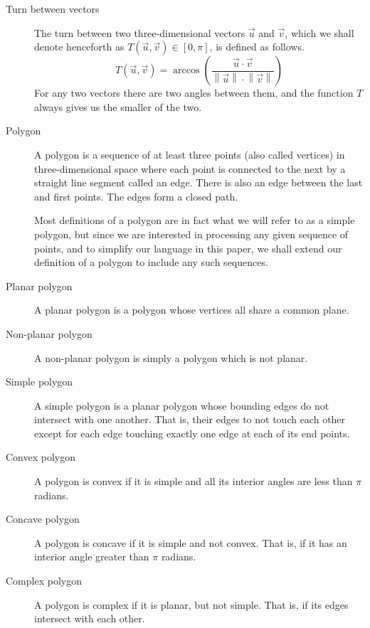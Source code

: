 \documentclass{article}
\newcommand{\len}[1]{\left\lVert #1 \right\rVert}
\begin{document}
\begin{description}
	\item[Turn between vectors]
		The turn between two three-dimensional vectors \(\vec{u}\) and \(\vec{v}\), which we shall denote henceforth as \(T(\vec{u}, \vec{v}) \in [0, \pi]\), is defined as follows.
		\begin{equation*}
			T(\vec{u}, \vec{v}) = \arccos \left( \frac{\vec{u} \cdot \vec{v}} {\len{\vec{u}} \cdot \len{\vec{v}}} \right)
		\end{equation*}
		For any two vectors there are two angles between them, and the function \(T\) always gives us the smaller of the two.

	\item[Polygon]
		A polygon is a sequence of at least three points (also called vertices) in three-dimensional space where each point is connected to the next by a straight line segment called an edge. There is also an edge between the last and first points. The edges form a closed path.

		Most definitions of a polygon are in fact what we will refer to as a simple polygon, but since we are interested in processing any given sequence of points, and to simplify our language in this paper, we shall extend our definition of a polygon to include any such sequences.

	\item[Planar polygon]
		A planar polygon is a polygon whose vertices all share a common plane.

	\item[Non-planar polygon]
		A non-planar polygon is simply a polygon which is not planar.

	\item[Simple polygon]
		A simple polygon is a planar polygon whose bounding edges do not intersect with one another. That is, their edges to not touch each other except for each edge touching exactly one edge at each of its end points.

	\item[Convex polygon]
		A polygon is convex if it is simple and all its interior angles are less than \(\pi\) radians.

	\item[Concave polygon]
		A polygon is concave if it is simple and not convex. That is, if it has an interior angle greater than \(\pi\) radians.

	\item[Complex polygon]
		A polygon is complex if it is planar, but not simple. That is, if its edges intersect with each other.


\end{description}
\end{document}
